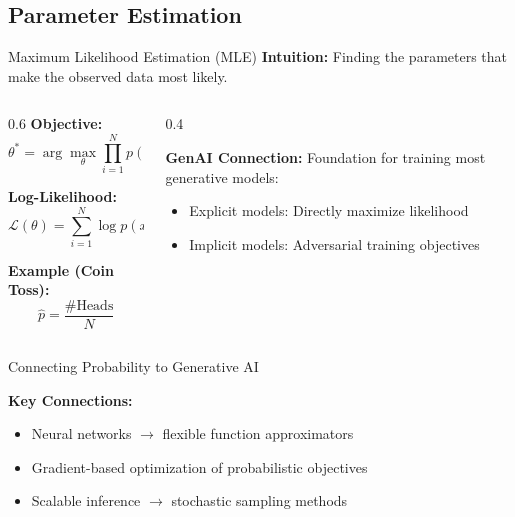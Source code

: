 \documentclass[5pt,aspectratio=169]{beamer}
\begin{document}
\subsection{Parameter Estimation}
\begin{frame}{Maximum Likelihood Estimation (MLE)}
\textbf{Intuition:} Finding the parameters that make the observed data most likely.
\begin{columns}[T]
\begin{column}{0.6\textwidth}
\textbf{Objective:}
\[ \theta^* = \arg\max_\theta \prod_{i=1}^N p(x_i|\theta) \]

\textbf{Log-Likelihood:}
\[ \mathcal{L}(\theta) = \sum_{i=1}^N \log p(x_i|\theta) \]

\textbf{Example (Coin Toss):}
\[ \hat{p} = \frac{\text{\# Heads}}{N} \]
\end{column}

\begin{column}{0.4\textwidth}

\vspace{0.5cm}
\textbf{GenAI Connection:} Foundation for training most generative models:
\begin{itemize}
\item Explicit models: Directly maximize likelihood
\item Implicit models: Adversarial training objectives
\end{itemize}
\end{column}
\end{columns}
\end{frame}

\begin{frame}{Connecting Probability to Generative AI}
\begin{center}
\end{center}

\textbf{Key Connections:}
\begin{itemize}
\item Neural networks $\rightarrow$ flexible function approximators
\item Gradient-based optimization of probabilistic objectives
\item Scalable inference $\rightarrow$ stochastic sampling methods
\end{itemize}
\end{frame}
\end{document}
